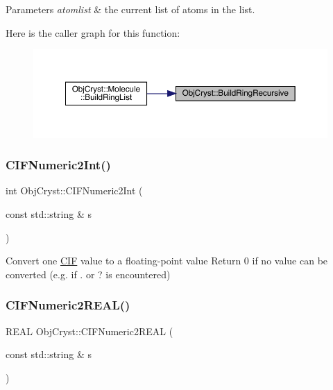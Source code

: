 \begin{DoxyParams}{Parameters}
{\em atomlist} & the current list of atoms in the list. \\
\hline
\end{DoxyParams}
Here is the caller graph for this function\+:
\nopagebreak
\begin{figure}[H]
\begin{center}
\leavevmode
\includegraphics[width=350pt]{namespace_obj_cryst_acb0b160e8f24597d041fd18e19bd8214_icgraph}
\end{center}
\end{figure}
\mbox{\label{namespace_obj_cryst_a9c498cb6e7dfbb2de295c6d0462ee67b}} 
\subsubsection{\texorpdfstring{CIFNumeric2Int()}{CIFNumeric2Int()}}
{\footnotesize\ttfamily int Obj\+Cryst\+::\+C\+I\+F\+Numeric2\+Int (\begin{DoxyParamCaption}\item[{const std\+::string \&}]{s }\end{DoxyParamCaption})}

Convert one \mbox{\hyperlink{class_obj_cryst_1_1_c_i_f}{C\+IF}} value to a floating-\/point value Return 0 if no value can be converted (e.\+g. if \textquotesingle{}.\textquotesingle{} or \textquotesingle{}?\textquotesingle{} is encountered) \mbox{\label{namespace_obj_cryst_a1c273a894c75226abfe29f4494fdb11d}} 
\subsubsection{\texorpdfstring{CIFNumeric2REAL()}{CIFNumeric2REAL()}}
{\footnotesize\ttfamily R\+E\+AL Obj\+Cryst\+::\+C\+I\+F\+Numeric2\+R\+E\+AL (\begin{DoxyParamCaption}\item[{const std\+::string \&}]{s }\end{DoxyParamCaption})}

